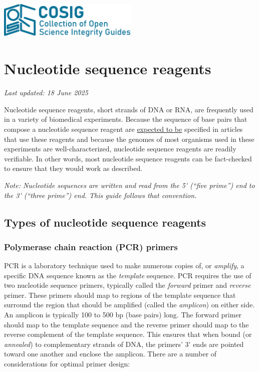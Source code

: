 \documentclass[letterpaper, 12pt]{article}
\begin{document}
\flushleft
\includegraphics[width=0.5\textwidth]{img/home/241017_final_logo_mockup.png}

\section*{Nucleotide sequence reagents}
\textit{Last updated: 18 June 2025}

Nucleotide sequence reagents, short strands of DNA or RNA, are frequently used in a variety of biomedical experiments. Because the sequence of base pairs that compose a nucleotide sequence reagent are \href{https://doi.org/10.1373/clinchem.2008.112797}{expected to be} specified in articles that use these reagents and because the genomes of most organisms used in these experiments are well-characterized, nucleotide sequence reagents are readily verifiable. In other words, most nucleotide sequence reagents can be fact-checked to ensure that they would work as described.

\textit{Note: Nucleotide sequences are written and read from the 5\'{} (``five prime'') end to the 3\'{} (``three prime'') end. This guide follows that convention.}

\subsection*{Types of nucleotide sequence reagents}

\subsubsection*{Polymerase chain reaction (PCR) primers}

PCR is a laboratory technique used to make numerous copies of, or \emph{amplify}, a specific DNA sequence known as the \emph{template} sequence. PCR requires the use of two nucleotide sequence primers, typically called the \emph{forward} primer and \emph{reverse} primer. These primers should map to regions of the template sequence that surround the region that should be amplified (called the \emph{amplicon}) on either side. An amplicon is typically 100 to 500 bp (base pairs) long. The forward primer should map to the template sequence and the reverse primer should map to the reverse complement of the template sequence. This ensures that when bound (or \emph{annealed}) to complementary strands of DNA, the primers' 3\'{} ends are pointed toward one another and enclose the amplicon. There are a number of considerations for optimal primer design:
\end{document}
